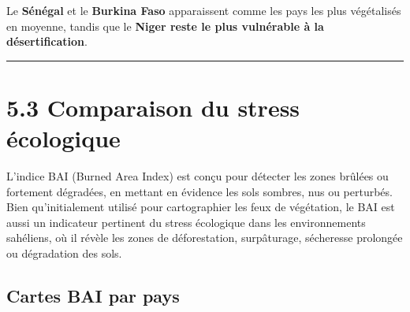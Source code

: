 \documentclass[
]{book}
\begin{document}
Le \textbf{Sénégal} et le \textbf{Burkina Faso} apparaissent comme les pays les plus végétalisés en moyenne, tandis que le \textbf{Niger reste le plus vulnérable à la désertification}.

\begin{center}\rule{0.5\linewidth}{0.5pt}\end{center}

\section{5.3 Comparaison du stress écologique}\label{comparaison-du-stress-uxe9cologique}

L'indice BAI (Burned Area Index) est conçu pour détecter les zones brûlées ou fortement dégradées, en mettant en évidence les sols sombres, nus ou perturbés. Bien qu'initialement utilisé pour cartographier les feux de végétation, le BAI est aussi un indicateur pertinent du stress écologique dans les environnements sahéliens, où il révèle les zones de déforestation, surpâturage, sécheresse prolongée ou dégradation des sols.

\subsection{Cartes BAI par pays}\label{cartes-bai-par-pays}
\end{document}
